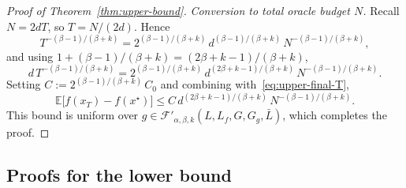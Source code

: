\documentclass{article}
\renewcommand{\leq}{\leqslant}
\theoremstyle{definition}
\begin{document}
\begin{proof}[Proof of Theorem~\ref{thm:upper-bound}]
\medskip
\noindent\textit{Conversion to total oracle budget $N$.}
Recall $N=2dT$, so $T=N/(2d)$. Hence
\[
T^{-(\beta-1)/(\beta+k)}
=2^{(\beta-1)/(\beta+k)}\,d^{(\beta-1)/(\beta+k)}\,
N^{-(\beta-1)/(\beta+k)},
\]
and using $1+(\beta-1)/(\beta+k)=(2\beta+k-1)/(\beta+k)$,
\[
d\,T^{-(\beta-1)/(\beta+k)}
=2^{(\beta-1)/(\beta+k)}\,d^{(2\beta+k-1)/(\beta+k)}\,
N^{-(\beta-1)/(\beta+k)}.
\]
Setting $C:=2^{(\beta-1)/(\beta+k)}\,C_0$ and combining 
with~\eqref{eq:upper-final-T},
\[
\mathbb{E}\bigl[f(x_T)-f(x^\star)\bigr]
\leq C\,d^{(2\beta+k-1)/(\beta+k)}\,N^{-(\beta-1)/(\beta+k)}.
\]
This bound is uniform over 
$g\in\mathcal{F}'_{\alpha,\beta,k}(L,L_f,G,G_g,\bar{L})$, which 
completes the proof.
\end{proof}


\subsection{Proofs for the lower bound}
\end{document}
